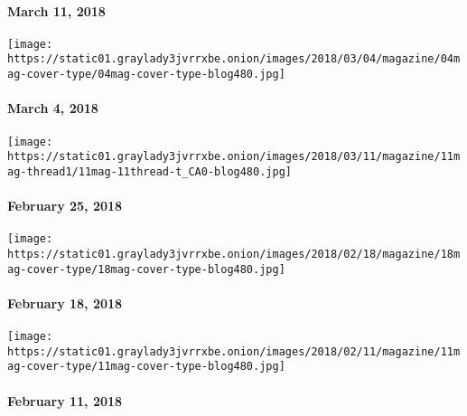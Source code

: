 \hypertarget{march-11-2018}{%
\paragraph{March 11, 2018}\label{march-11-2018}}

\href{https://www.nytimes3xbfgragh.onion/issue/magazine/2018/03/30/3418-issue}{}

\texttt{[image: https://static01.graylady3jvrrxbe.onion/images/2018/03/04/magazine/04mag-cover-type/04mag-cover-type-blog480.jpg]}

\hypertarget{march-4-2018}{%
\paragraph{March 4, 2018}\label{march-4-2018}}

\href{https://www.nytimes3xbfgragh.onion/issue/magazine/2018/03/30/022518}{}

\texttt{[image: https://static01.graylady3jvrrxbe.onion/images/2018/03/11/magazine/11mag-thread1/11mag-11thread-t\_CA0-blog480.jpg]}

\hypertarget{february-25-2018}{%
\paragraph{February 25, 2018}\label{february-25-2018}}

\href{https://www.nytimes3xbfgragh.onion/issue/magazine/2018/02/16/21818-issue}{}

\texttt{[image: https://static01.graylady3jvrrxbe.onion/images/2018/02/18/magazine/18mag-cover-type/18mag-cover-type-blog480.jpg]}

\hypertarget{february-18-2018}{%
\paragraph{February 18, 2018}\label{february-18-2018}}

\href{https://www.nytimes3xbfgragh.onion/issue/magazine/2018/02/09/21118-issue}{}

\texttt{[image: https://static01.graylady3jvrrxbe.onion/images/2018/02/11/magazine/11mag-cover-type/11mag-cover-type-blog480.jpg]}

\hypertarget{february-11-2018}{%
\paragraph{February 11, 2018}\label{february-11-2018}}

\href{https://www.nytimes3xbfgragh.onion/interactive/2018/01/30/magazine/winter-olympics-alpine-skiing-lindsey-vonn-workout.html}{}


